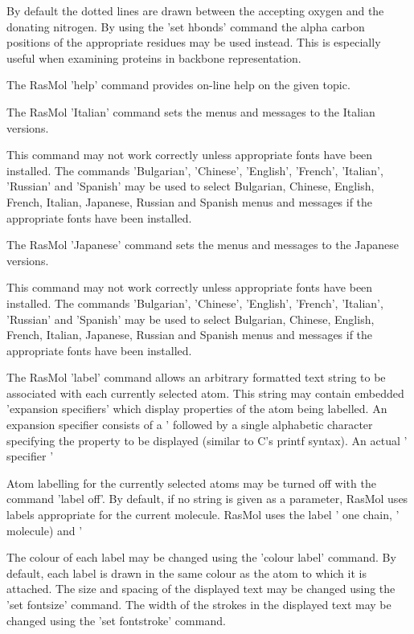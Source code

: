 By default the dotted lines are drawn between the accepting oxygen and
the donating nitrogen. By using the
'set hbonds'
command the alpha carbon positions of the appropriate residues may be
used instead. This is especially useful when examining proteins in
backbone representation.

The RasMol
'help'
command provides on-line help on the given topic.

The RasMol
'Italian'
command sets the menus and messages to the Italian versions.

This command may not work correctly unless appropriate fonts
have been installed.  The commands
'Bulgarian',
'Chinese',
'English',
'French',
'Italian',
'Russian'
and
'Spanish'
may be used to select Bulgarian, Chinese, English, French,
Italian, Japanese, Russian and Spanish menus and messages if the
appropriate fonts have been installed.

The RasMol
'Japanese'
command sets the menus and messages to the Japanese versions.

This command may not work correctly unless appropriate fonts
have been installed.  The commands
'Bulgarian',
'Chinese',
'English',
'French',
'Italian',
'Russian'
and
'Spanish'
may be used to select Bulgarian, Chinese, English, French,
Italian, Japanese, Russian and Spanish menus and messages if the
appropriate fonts have been installed.

The RasMol
'label'
command allows an arbitrary formatted text string to be
associated with each currently selected atom.  This string may contain
embedded 'expansion specifiers' which display properties of the atom
being labelled. An expansion specifier consists of a '%
followed by a single alphabetic character specifying the property to be
displayed (similar to C's printf syntax).
An actual '%
specifier '%

Atom labelling for the currently selected atoms may be turned off with
the command
'label off'.
By default, if no string is given as a parameter, RasMol uses labels
appropriate for the current molecule.
RasMol uses the label '%
one chain, '%
molecule) and '%

The colour of each label may be changed using the
'colour label'
command. By default, each label is drawn in the same colour as the atom
to which it is attached. The size and spacing of the displayed text
may be changed using the
'set fontsize'
command.  The width of the strokes in the displayed text may be changed
 using the
'set fontstroke'
 command.

